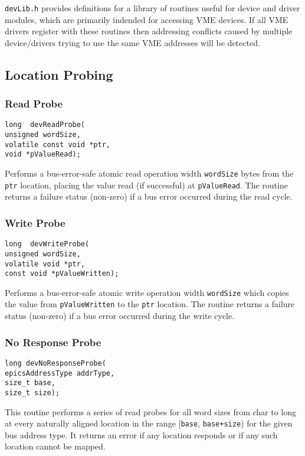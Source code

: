 \verb|devLib.h| provides definitions for a library of routines useful for device and driver modules, which are primarily 
indended for accessing VME devices. If all VME drivers register with these routines  then  addressing conflicts caused by 
multiple device/drivers trying to use the same VME addresses will be detected.

\subsection{Location Probing}

\subsubsection{Read Probe}

\begin{verbatim}long  devReadProbe(
unsigned wordSize,
volatile const void *ptr,
void *pValueRead);
\end{verbatim}Performs a bus-error-safe atomic read operation width \verb|wordSize| bytes from the \verb|ptr| location, placing the value read (if 
successful) at \verb|pValueRead|. The routine returns a failure status (non-zero) if a bus error occurred during the read cycle.

\subsubsection{Write Probe}

\begin{verbatim}long  devWriteProbe(
unsigned wordSize,
volatile void *ptr,
const void *pValueWritten);
\end{verbatim}Performs a bus-error-safe atomic write operation width \verb|wordSize| which copies the value from \verb|pValueWritten| to the 
\verb|ptr| location. The routine returns a failure status (non-zero) if a bus error occurred during the write cycle.

\subsubsection{No Response Probe}

\begin{verbatim}long devNoResponseProbe(
epicsAddressType addrType,
size_t base,
size_t size);
\end{verbatim}This routine performs a series of read probes for all word sizes from char to long at every naturally aligned location in the 
range [\verb|base|, \verb|base+size|) for the given bus address type. It returns an error if any location responds or if any such 
location cannot be mapped.

